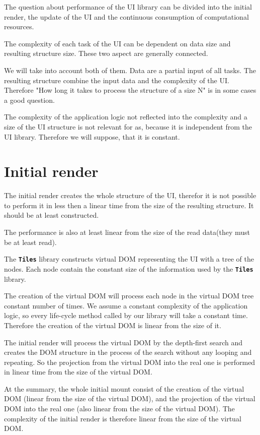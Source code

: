 \documentclass[oneside, 12pt]{book}
\newcommand{\tiles}[0]{\textbf{\texttt{Tiles}} }
\begin{document}
  The question about performance of the UI library can be divided into the initial render, 
  the update of the UI and the continuous consumption of computational resources.

  The complexity of each task of the UI can be dependent on data size and resulting structure size. 
  These two aspect are generally connected. 

  We will take into account both of them. 
  Data are a partial input of all tasks. 
  The resulting structure combine the input data and the complexity of the UI. 
  Therefore "How long it takes to process the structure of a size N" is in some cases a good question.

  The complexity of the application logic not reflected into the complexity and a size of the UI structure is not relevant for as, 
  because it is independent from the UI library. Therefore we will suppose, that it is constant. 

  \section{Initial render}\label{sec:performance-initial-render}
    
    The initial render creates the whole structure of the UI, 
    therefor it is not possible to perform it in less then a linear time from the size of the resulting structure.
    It should be at least constructed.

    The performance is also at least linear from the size of the read data(they must be at least read).

    The \tiles library constructs virtual DOM representing the UI with a tree of the nodes. 
    Each node contain the constant size of the information used by the \tiles library. 

    The creation of the virtual DOM will process each node in the virtual DOM tree constant number of times. 
    We assume a constant complexity of the application logic, so every life-cycle method called by our library will take a constant time.
    Therefore the creation of the virtual DOM is linear from the size of it.

    The initial render will process the virtual DOM by the depth-first search 
    and creates the DOM structure in the process of the search without any looping and repeating.
    So the projection from the virtual DOM into the real one is performed in linear time from the size of the virtual DOM.

    At the summary, the whole initial mount consist of the creation of the virtual DOM (linear from the size of the virtual DOM), 
    and the projection of the virtual DOM into the real one (also linear from the size of the virtual DOM).
    The complexity of the initial render is therefore linear from the size of the virtual DOM.
\end{document}
